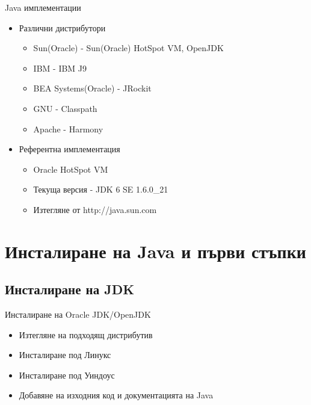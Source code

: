 \documentclass{beamer}
\begin{document}
\begin{frame}{Java имплементации}
  \transdissolve
  \begin{itemize}
  \item Различни дистрибутори
    \begin{itemize}
      \item Sun(Oracle) - Sun(Oracle) HotSpot VM, OpenJDK
      \item IBM - IBM J9
      \item BEA Systems(Oracle) - JRockit
      \item GNU - Classpath
      \item Apache - Harmony
    \end{itemize}

  \item Референтна имплементация
    \begin{itemize}
      \item Oracle HotSpot VM
      \item Текуща версия - JDK 6 SE 1.6.0\_21
      \item Изтегляне от http://java.sun.com
    \end{itemize}
  \end{itemize}
\end{frame}

\section{Инсталиране на Java и първи стъпки}
\subsection{Инсталиране на JDK}
\begin{frame}{Инсталиране на Oracle JDK/OpenJDK}
  \transdissolve  
  \begin{itemize}
    \item Изтегляне на подходящ дистрибутив
    \item Инсталиране под Линукс
    \item Инсталиране под Уиндоус
    \item Добавяне на изходния код и
      документацията на Java
  \end{itemize}
\end{frame}
\end{document}

